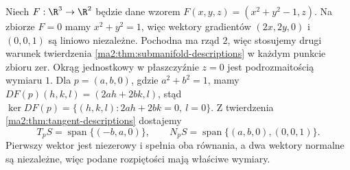 \begin{przyklad}
\label{ma2:ex:submanifold-circle}
Niech $F:\R^3\to\R^2$ będzie dane wzorem
$F(x,y,z)=(x^2+y^2-1,z)$. Na zbiorze $F=0$
mamy $x^2+y^2=1$, więc wektory gradientów
$(2x,2y,0)$ i $(0,0,1)$ są liniowo niezależne.
Pochodna ma rząd $2$, więc stosujemy drugi warunek
twierdzenia \ref{ma2:thm:submanifold-descriptions}
w każdym punkcie zbioru zer. Okrąg jednostkowy
w płaszczyźnie $z=0$ jest podrozmaitością wymiaru $1$.
Dla $p=(a,b,0)$, gdzie $a^2+b^2=1$, mamy
$DF(p)(h,k,l)=(2ah+2bk,l)$, stąd
$\ker DF(p)=\{(h,k,l):2ah+2bk=0,\ l=0\}$.
Z twierdzenia \ref{ma2:thm:tangent-descriptions} dostajemy
\[
 T_pS=\operatorname{span}\{(-b,a,0)\},\qquad
 N_pS=\operatorname{span}\{(a,b,0),(0,0,1)\}.
\]
Pierwszy wektor jest niezerowy i spełnia oba równania,
a dwa wektory normalne są niezależne, więc podane
rozpiętości mają właściwe wymiary.
\end{przyklad}
